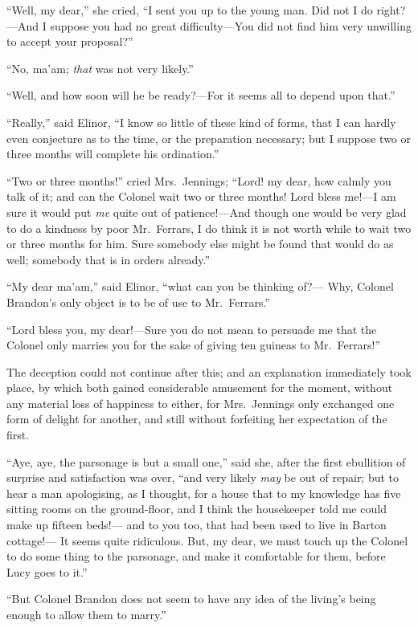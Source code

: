 \documentclass{article}
\begin{document}
``Well, my dear,'' she cried, ``I sent you up to the
young man.  Did not I do right?---And I suppose you had
no great difficulty---You did not find him very unwilling
to accept your proposal?''

``No, ma'am; \emph{that} was not very likely.''

``Well, and how soon will he be ready?---For it seems
all to depend upon that.''

``Really,'' said Elinor, ``I know so little of these kind
of forms, that I can hardly even conjecture as to the time,
or the preparation necessary; but I suppose two or three
months will complete his ordination.''

``Two or three months!'' cried Mrs.\ Jennings; ``Lord! my dear,
how calmly you talk of it; and can the Colonel wait two
or three months! Lord bless me!---I am sure it would put \emph{me}
quite out of patience!---And though one would be very glad
to do a kindness by poor Mr.\ Ferrars, I do think it is
not worth while to wait two or three months for him.
Sure somebody else might be found that would do as well;
somebody that is in orders already.''

``My dear ma'am,'' said Elinor, ``what can you be thinking of?---%
Why, Colonel Brandon's only object is to be of use to Mr.\ Ferrars.''

``Lord bless you, my dear!---Sure you do not mean to persuade
me that the Colonel only marries you for the sake of giving
ten guineas to Mr.\ Ferrars!''

The deception could not continue after this;
and an explanation immediately took place, by which both
gained considerable amusement for the moment, without any
material loss of happiness to either, for Mrs.\ Jennings
only exchanged one form of delight for another, and still
without forfeiting her expectation of the first.

``Aye, aye, the parsonage is but a small one,'' said she,
after the first ebullition of surprise and satisfaction
was over, ``and very likely \emph{may} be out of repair; but to hear
a man apologising, as I thought, for a house that to my
knowledge has five sitting rooms on the ground-floor, and I
think the housekeeper told me could make up fifteen beds!---%
and to you too, that had been used to live in Barton cottage!---%
It seems quite ridiculous.  But, my dear, we must
touch up the Colonel to do some thing to the parsonage,
and make it comfortable for them, before Lucy goes to it.''

``But Colonel Brandon does not seem to have any idea
of the living's being enough to allow them to marry.''
\end{document}
